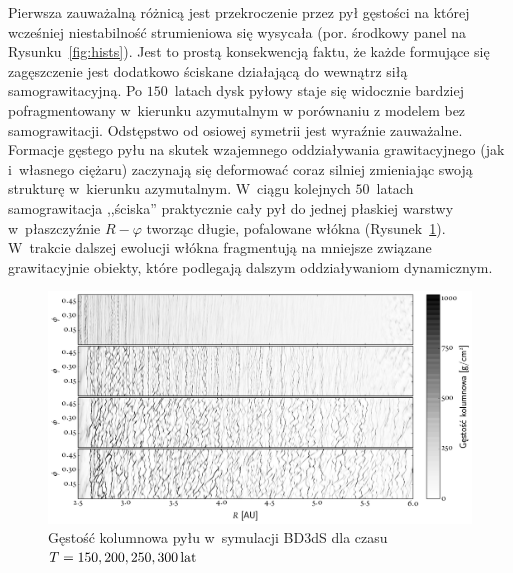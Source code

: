 %
Pierwsza zauważalną różnicą jest przekroczenie przez pył gęstości na której
wcześniej niestabilność strumieniowa się wysycała (por. środkowy panel na
Rysunku~\ref{fig:hists}). Jest to prostą konsekwencją faktu, że każde formujące
się zagęszczenie jest dodatkowo ściskane działającą do wewnątrz siłą
samograwitacyjną. Po $150$~latach dysk pyłowy staje się widocznie bardziej
pofragmentowany w~kierunku azymutalnym w porównaniu z modelem bez
samograwitacji.  Odstępstwo od osiowej symetrii jest wyraźnie zauważalne.
Formacje gęstego pyłu na skutek wzajemnego oddziaływania grawitacyjnego (jak
i~własnego ciężaru) zaczynają się deformować coraz silniej zmieniając swoją
strukturę w~kierunku azymutalnym. W~ciągu kolejnych $50$~latach samograwitacja
,,ściska'' praktycznie cały pył do jednej płaskiej warstwy w~płaszczyźnie $R -
\varphi$ tworząc długie, pofalowane włókna (Rysunek~\ref{fig:projs}). W~trakcie
dalszej ewolucji włókna fragmentują na mniejsze związane grawitacyjnie obiekty,
które podlegają dalszym oddziaływaniom dynamicznym. 
%
\begin{figure}
   \centering
   \includegraphics[width=0.95\linewidth]{figures/proj_sg}
   \caption{Gęstość kolumnowa pyłu w~symulacji BD3dS dla czasu $T=150, 200, 250, 300\hbox{$\thinspace\textrm{lat}$}$}
   \label{fig:projs}
\end{figure}
%
